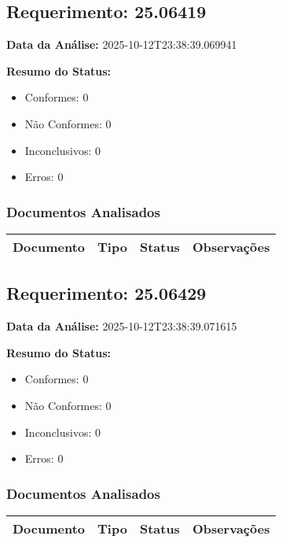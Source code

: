 \documentclass[12pt,a4paper]{article}
\begin{document}
\subsection{Requerimento: 25.06419}

\textbf{Data da Análise:} 2025-10-12T23:38:39.069941

\textbf{Resumo do Status:}
\begin{itemize}
    \item Conformes: 0
    \item Não Conformes: 0
    \item Inconclusivos: 0
    \item Erros: 0
\end{itemize}

\subsubsection{Documentos Analisados}

\begin{longtable}{|p{4cm}|p{2cm}|p{2cm}|p{6cm}|}
\hline
\textbf{Documento} & \textbf{Tipo} & \textbf{Status} & \textbf{Observações} \\
\hline
\endhead
\end{longtable}


\subsection{Requerimento: 25.06429}

\textbf{Data da Análise:} 2025-10-12T23:38:39.071615

\textbf{Resumo do Status:}
\begin{itemize}
    \item Conformes: 0
    \item Não Conformes: 0
    \item Inconclusivos: 0
    \item Erros: 0
\end{itemize}

\subsubsection{Documentos Analisados}

\begin{longtable}{|p{4cm}|p{2cm}|p{2cm}|p{6cm}|}
\hline
\textbf{Documento} & \textbf{Tipo} & \textbf{Status} & \textbf{Observações} \\
\hline
\endhead
\end{longtable}
\end{document}

